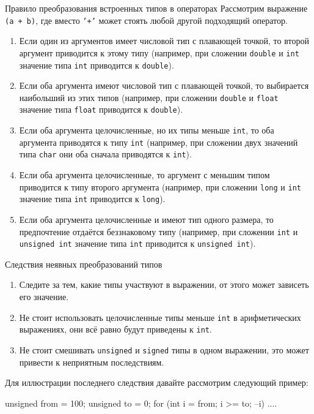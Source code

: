 \documentclass[
    9pt,
    hyperref={pdfencoding=unicode}
    ]{beamer}
\begin{document}
\begin{frame}{Правило преобразования встроенных типов в операторах}
    Рассмотрим выражение \texttt{(a + b)}, где вместо \texttt{'+'} может стоять любой другой подходящий оператор.
    \begin{enumerate}
        \item Если один из аргументов имеет числовой тип с плавающей точкой, то второй аргумент приводится к этому типу (например, при сложении \texttt{double} и \texttt{int} значение типа \texttt{int} приводится к \texttt{double}).
        \item Если оба аргумента имеют числовой тип с плавающей точкой, то выбирается наибольший из этих типов (например, при сложении \texttt{double} и \texttt{float} значение типа \texttt{float} приводится к \texttt{double}).
        \item Если оба аргумента целочисленные, но их типы меньше \texttt{int}, то оба аргумента приводятся к типу \texttt{int} (например, при сложении двух значений типа \texttt{char} они оба сначала приводятся к \texttt{int}).
        \item Если оба аргумента целочисленные, то аргумент с меньшим типом приводится к типу второго аргумента (например, при сложении \texttt{long} и \texttt{int} значение типа \texttt{int} приводится к \texttt{long}).
        \item Если оба аргумента целочисленные и имеют тип одного размера, то предпочтение отдаётся беззнаковому типу (например, при сложении \texttt{int} и \texttt{unsigned int} значение типа \texttt{int} приводится к \texttt{unsigned int}).
    \end{enumerate}
\end{frame}

\begin{frame}[fragile]{Следствия неявных преобразований типов}
    \begin{enumerate}
        \item Следите за тем, какие типы участвуют в выражении, от этого может зависеть его значение.
        \item Не стоит использовать целочисленные типы меньше \texttt{int} в арифметических выражениях, они всё равно будут приведены к \texttt{int}.
        \item \alert{Не стоит смешивать \texttt{unsigned} и \texttt{signed}} типы в одном выражении, это может привести к неприятным последствиям.
    \end{enumerate}

    Для иллюстрации последнего следствия давайте рассмотрим следующий пример:
    \begin{cppcode}
        unsigned from = 100;
        unsigned to = 0;
        for (int i = from; i >= to; --i) {  ....  }
    \end{cppcode}    
\end{frame}
\end{document}
